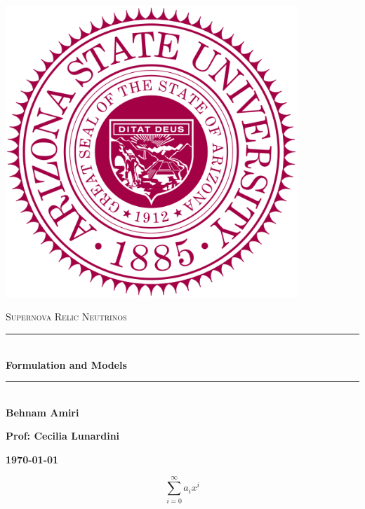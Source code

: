 \documentclass[fleqn]{article}
\begin{document}
  \begin{titlepage}

    \newcommand{\HRule}{\rule{\linewidth}{0.5mm}}

    \center

    \begin{center}
      \includegraphics[height=11cm, width=11cm]{asu.png}
    \end{center}

    \vline

    \textsc{\LARGE Supernova Relic Neutrinos}\\[1.5cm]

    \HRule \\[0.5cm]
    { \huge \bfseries Formulation and Models}\\[0.4cm] 
    \HRule \\[1.0cm]

    \textbf{Behnam Amiri}

    \bigbreak

    \textbf{Prof: Cecilia Lunardini}

    \bigbreak

    \textbf{{\large \today}\\[2cm]}

    \vfill

  \end{titlepage}

  \begin{equation}
    \label{eq:1}
    \sum_{i=0}^{\infty} a_i x^i
  \end{equation}
\end{document}
